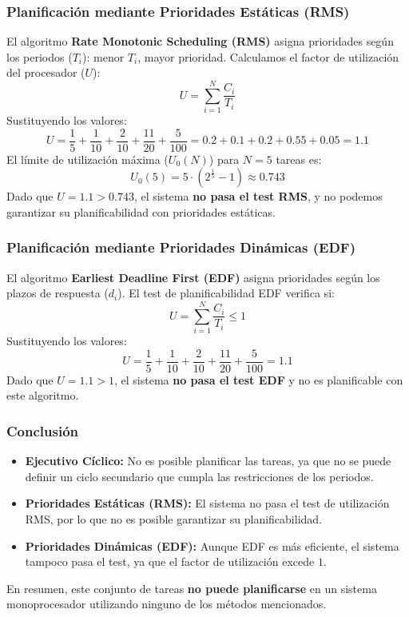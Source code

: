 \documentclass[a4paper,12pt]{article}
\begin{document}
\subsubsection{Planificación mediante Prioridades Estáticas (RMS)}
El algoritmo \textbf{Rate Monotonic Scheduling (RMS)} asigna prioridades según los periodos (\(T_i\)): menor \(T_i\), mayor prioridad. Calculamos el factor de utilización del procesador (\(U\)):
\[
U = \sum_{i=1}^N \frac{C_i}{T_i}
\]
Sustituyendo los valores:
\[
U = \frac{1}{5} + \frac{1}{10} + \frac{2}{10} + \frac{11}{20} + \frac{5}{100} = 0.2 + 0.1 + 0.2 + 0.55 + 0.05 = 1.1
\]
El límite de utilización máxima (\(U_0(N)\)) para \(N = 5\) tareas es:
\[
U_0(5) = 5 \cdot (2^{\frac{1}{5}} - 1) \approx 0.743
\]
Dado que \(U = 1.1 > 0.743\), el sistema \textbf{no pasa el test RMS}, y no podemos garantizar su planificabilidad con prioridades estáticas.

\subsubsection{Planificación mediante Prioridades Dinámicas (EDF)}
El algoritmo \textbf{Earliest Deadline First (EDF)} asigna prioridades según los plazos de respuesta (\(d_i\)). El test de planificabilidad EDF verifica si:
\[
U = \sum_{i=1}^N \frac{C_i}{T_i} \leq 1
\]
Sustituyendo los valores:
\[
U = \frac{1}{5} + \frac{1}{10} + \frac{2}{10} + \frac{11}{20} + \frac{5}{100} = 1.1
\]
Dado que \(U = 1.1 > 1\), el sistema \textbf{no pasa el test EDF} y no es planificable con este algoritmo.

\subsubsection{Conclusión}
\begin{itemize}
    \item \textbf{Ejecutivo Cíclico:} No es posible planificar las tareas, ya que no se puede definir un ciclo secundario que cumpla las restricciones de los periodos.
    \item \textbf{Prioridades Estáticas (RMS):} El sistema no pasa el test de utilización RMS, por lo que no es posible garantizar su planificabilidad.
    \item \textbf{Prioridades Dinámicas (EDF):} Aunque EDF es más eficiente, el sistema tampoco pasa el test, ya que el factor de utilización excede \(1\).
\end{itemize}

En resumen, este conjunto de tareas \textbf{no puede planificarse} en un sistema monoprocesador utilizando ninguno de los métodos mencionados.
\end{document}
